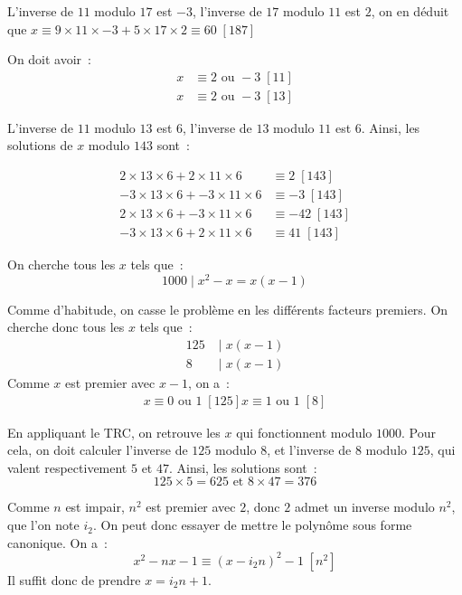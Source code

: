 \begin{sol}
	L'inverse de $11$ modulo $17$ est $-3$, l'inverse de $17$ modulo $11$ est $2$, on en déduit que $x \equiv 9 \times 11 \times -3 + 5 \times 17 \times 2 \equiv 60 \; [187]$
\end{sol}

\begin{sol}
	On doit avoir~:
	\begin{align*}
		x &\equiv 2 \mbox{ ou } -3 \; [11] \\
		x &\equiv 2 \mbox{ ou } -3 \; [13]
	\end{align*}
	
	L'inverse de $11$ modulo $13$ est $6$, l'inverse de $13$ modulo $11$ est $6$. Ainsi, les solutions de $x$ modulo $143$ sont~:
	
	\begin{align*}
		2 \times 13 \times 6 + 2 \times 11 \times 6 &\equiv 2 \; [143] \\
		-3 \times 13 \times 6 + -3 \times 11 \times 6 &\equiv -3 \; [143] \\
		2 \times 13 \times 6 + -3 \times 11 \times 6 &\equiv -42 \; [143] \\
		-3 \times 13 \times 6 + 2 \times 11 \times 6 &\equiv 41 \; [143]
	\end{align*}
\end{sol}

\begin{sol}
	On cherche tous les $x$ tels que~:
	$$1000 \;|\; x^2 - x = x(x - 1)$$
	
	Comme d'habitude, on casse le problème en les différents facteurs premiers.
	On cherche donc tous les $x$ tels que~:
	\begin{align*}
	125 &\;|\; x(x - 1) \\
	8 &\;|\; x(x - 1)
	\end{align*}
	Comme $x$ est premier avec $x - 1$, on a~:
	\begin{align*}
	x \equiv 0 \mbox{ ou } 1 \; [125]
	x \equiv 1 \mbox{ ou } 1 \; [8]
	\end{align*}
	
	En appliquant le TRC, on retrouve les $x$ qui fonctionnent modulo $1000$.
	Pour cela, on doit calculer l'inverse de $125$ modulo $8$, et l'inverse de $8$ modulo $125$, qui valent respectivement $5$ et $47$.
	Ainsi, les solutions sont~:
	$$125 \times 5 = 625 \mbox{ et } 8 \times 47 = 376$$
\end{sol}

\begin{sol}
	Comme $n$ est impair, $n^2$ est premier avec $2$, donc $2$ admet un inverse modulo $n^2$, que l'on note $i_2$. On peut donc essayer de mettre le polynôme sous forme canonique.
	On a~:
	$$x^2 - nx - 1 \equiv (x - i_2 n)^2 - 1 \; [n^2]$$
	Il suffit donc de prendre $x = i_2 n + 1$.
\end{sol}

